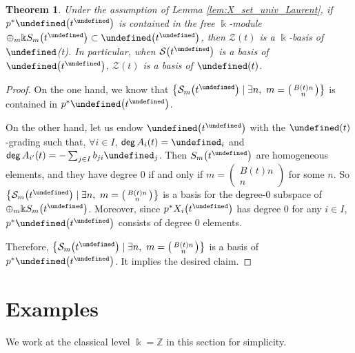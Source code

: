 \documentclass[10pt,a4paper]{amsart}
\newcommand{\kk}{\Bbbk}
\newcommand{\Z}{\mathbb{Z}}
\newcommand{\opname}[1]{\operatorname{\mathsf{#1}}}
\renewcommand{\deg}{\opname{deg}}
\newcommand{\cS}{{\mathcal S}}
\newcommand{\cZ}{{\mathcal Z}}
\let\Mc\undefined
\let\upClAlg\undefined
\let\XClAlg\undefined
\let\LP\undefined
\let\prin\undefined
\let\ff\undefined
\newcommand{\Mc}{M^\circ}
\newcommand{\upClAlg}{\mathcal{U}^A}
\newcommand{\XClAlg}{\mathcal{U}^X}
\newcommand{\LP}{{\mathcal{LP}}}
\newcommand{\prin}{{\opname{prin}}}
\newcommand{\ff}{\mathbf{f}}
\numberwithin{equation}{section}
\newtheorem{Theorem}{Theorem}[section]
\begin{document}
\begin{Theorem}\label{thm:construct_X_bases}
Under the assumption of Lemma {\rm \ref{lem:X_set_univ_Laurent}}, if $p^{*}\XClAlg\big(t^{\prin}\big)$ is contained in the free $\kk$-module
$\oplus_{m}\kk S_{m}\big(t^{\prin}\big)\subset\upClAlg\big(t^{\prin}\big)$, then
$\cZ(t)$ is a $\kk$-basis of $\XClAlg$(t). In particular, when
$\cS\big(t^{\prin}\big)$ is a basis of $\upClAlg\big(t^{\prin}\big)$, $\cZ(t)$
is a basis of $\XClAlg(t)$.
\end{Theorem}
\begin{proof}
On the one hand, we know that $\bigl\{\cS_{m}\big(t^{\prin}\big)\mid \exists n,\ m=\left(\begin{smallmatrix}
B(t)n\\
n
\end{smallmatrix}\right)\bigr\}$
 is contained in $p^{*}\XClAlg\big(t^{\prin}\big)$.

On the other hand, let us endow $\LP\big(t^{\prin}\big)$ with the $\Mc(t)$-grading
such that, $\forall i\in I$, $\deg A_{i}(t)=\ff_{i}$ and $\deg A_{i'}(t)=-\sum_{j\in I}b_{ji}\ff_{j}$.
Then $S_{m}\big(t^{\prin}\big)$ are homogeneous elements, and they have degree
$0$ if and only if $m=\left(\begin{smallmatrix}
B(t)n\\
n
\end{smallmatrix}\right)$ for some $n$. So $\bigl\{\cS_{m}\big(t^{\prin}\big)\mid \exists n,\ m=\left(\begin{smallmatrix}
B(t)n\\
n
\end{smallmatrix}\right)\bigr\}$ is a basis for the degree-$0$ subspace of $\oplus_{m}\kk S_{m}\big(t^{\prin}\big)$.
Moreover, since $p^{*}X_{i}\big(t^{\prin}\big)$ has degree $0$ for any $i\in I$,
$p^{*}\XClAlg\big(t^{\prin}\big)$ consists of degree $0$ elements.

Therefore, $\bigl\{\cS_{m}\big(t^{\prin}\big)\mid \exists n,\ m=\left(\begin{smallmatrix}
B(t)n\\
n
\end{smallmatrix}\right)\bigr\}$ is a basis of $p^{*}\XClAlg\big(t^{\prin}\big)$. It implies the desired
claim.
\end{proof}

\section{Examples}\label{sec:Examples}
We work at the classical level $\kk=\Z$ in this section for simplicity.
\end{document}
